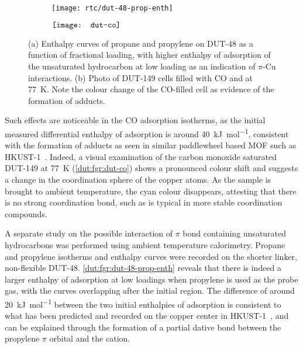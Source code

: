 \begin{figure}[htb]
    \centering
    \begin{subfigure}[c]{0.5\linewidth}
        \texttt{[image: rtc/dut-48-prop-enth]}%
        \caption{}\label{dut:fgr:dut-48-prop-enth}
    \end{subfigure}%
    \begin{subfigure}[h]{0.5\linewidth}
        \centering
        \(\vcenter{\hbox{{\texttt{[image: dut-co]}}}}\)%
        \caption{}\label{dut:fgr:dut-co}
    \end{subfigure}%
    \caption{(a) Enthalpy curves of propane and propylene on DUT-48 as 
    a function of fractional loading, with higher enthalpy of 
    adsorption of the unsaturated hydrocarbon at low loading as an 
    indication of \(\pi\)-Cu interactions. (b) Photo of DUT-149 cells
    filled with CO and  at \SI{77}{\kelvin}. Note the 
    colour change of the CO-filled cell as evidence of the formation of 
     adducts.}%
    \label{dut:fgr:dut-48-prop}
\end{figure}

Such effects are noticeable in the CO adsorption isotherms, 
as the initial measured differential enthalpy of adsorption is around 
\SI{40}{\kilo\joule\per\mol}, consistent with the formation of 
 adducts as seen in similar paddlewheel based 
MOF such as HKUST-1~\cite{prestipinoLocalStructureFramework2006}. 
Indeed, a visual examination of the carbon monoxide saturated 
DUT-149 at \SI{77}{\kelvin} 
(\autoref{dut:fgr:dut-co}) shows a pronounced colour shift and 
suggests a change in the coordination sphere of the copper 
atoms. As the sample is brought to ambient temperature, the 
cyan colour disappears, attesting that there is no strong 
coordination bond, such as is typical in more stable 
 coordination compounds.

A separate study on the possible interaction of 
\(\pi\) bond containing unsaturated hydrocarbons was performed
using ambient temperature calorimetry. Propane and propylene 
isotherms and enthalpy curves were recorded on the shorter 
linker, non-flexible DUT-48. \autoref{dut:fgr:dut-48-prop-enth}
reveals that there is indeed a larger enthalpy of adsorption
at low loadings when propylene is used as the probe gas, with 
the curves overlapping after the initial region. The difference 
of around \SI{20}{\kilo\joule\per\mol} between the two initial
enthalpies of adsorption is consistent to what has been predicted
and recorded on the copper center in 
HKUST-1~\cite{rubesAdsorptionPropanePropylene2013}, and can
be explained through the formation of a partial dative bond
between the propylene \(\pi\) orbital and the 
cation. 

